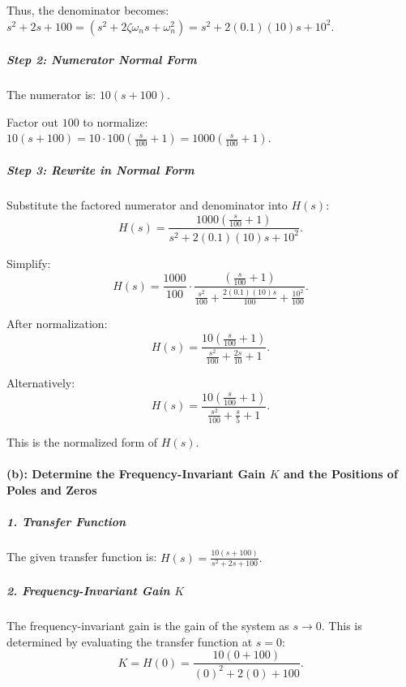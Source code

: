 \documentclass[11pt]{article}
\begin{document}
Thus, the denominator becomes:
\(s^2 + 2s + 100 = (s^2 + 2\zeta\omega_n s + \omega_n^2) = s^2 + 2(0.1)(10)s + 10^2.\)

\subparagraph{Step 2: Numerator Normal
Form}\label{step-2-numerator-normal-form}

The numerator is: \(10(s + 100).\)

Factor out \(100\) to normalize:
\(10(s + 100) = 10 \cdot 100 \left( \frac{s}{100} + 1 \right) = 1000 \left( \frac{s}{100} + 1 \right).\)

\subparagraph{Step 3: Rewrite in Normal
Form}\label{step-3-rewrite-in-normal-form}

Substitute the factored numerator and denominator into \(H(s)\):
\[H(s) = \frac{1000 \left( \frac{s}{100} + 1 \right)}{s^2 + 2(0.1)(10)s + 10^2}.\]

Simplify: \[
H(s) = \frac{1000}{100} \cdot \frac{\left( \frac{s}{100} + 1 \right)}{\frac{s^2}{100} + \frac{2(0.1)(10)s}{100} + \frac{10^2}{100}}.
\]

After normalization: \[
H(s) = \frac{10 \left( \frac{s}{100} + 1 \right)}{\frac{s^2}{100} + \frac{2s}{10} + 1}.
\]

Alternatively: \[
H(s) = \frac{10 \left( \frac{s}{100} + 1 \right)}{\frac{s^2}{100} + \frac{s}{5} + 1}.
\]

This is the normalized form of \(H(s)\).

    \paragraph{\texorpdfstring{(b): Determine the Frequency-Invariant Gain
\(K\) and the Positions of Poles and
Zeros}{(b): Determine the Frequency-Invariant Gain K and the Positions of Poles and Zeros}}\label{b-determine-the-frequency-invariant-gain-k-and-the-positions-of-poles-and-zeros}

\subparagraph{\texorpdfstring{1. \textbf{Transfer
Function}}{1. Transfer Function}}\label{transfer-function}

The given transfer function is:
\(H(s) = \frac{10(s + 100)}{s^2 + 2s + 100}.\)

\subparagraph{\texorpdfstring{2. \textbf{Frequency-Invariant Gain
\(K\)}}{2. Frequency-Invariant Gain K}}\label{frequency-invariant-gain-k}

The frequency-invariant gain is the gain of the system as \(s \to 0\).
This is determined by evaluating the transfer function at \(s = 0\): \[
K = H(0) = \frac{10(0 + 100)}{(0)^2 + 2(0) + 100}.
\]
\end{document}
